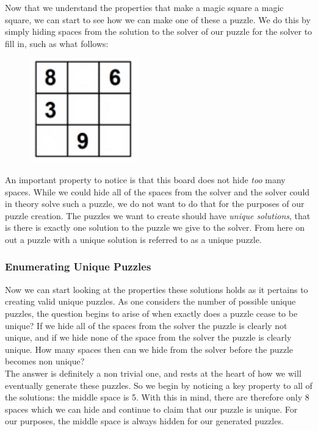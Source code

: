 \documentclass[a4paper]{article}
\begin{document}
Now that we understand the properties that make a magic square a magic square, we can start to see how we can make one of these a puzzle. We do this by simply hiding spaces from the solution to the solver of our puzzle for the solver to fill in, such as what follows:

\begin{figure} [h]
\includegraphics{puzzle_1}
\centering
\end{figure}

An important property to notice is that this board does not hide {\it too} many spaces. While we could hide all of the spaces from the solver and the solver could in theory solve such a puzzle, we do not want to do that for the purposes of our puzzle creation. The puzzles we want to create should have {\it unique solutions}, that is there is exactly one solution to the puzzle we give to the solver. From here on out a puzzle with a unique solution is referred to as a unique puzzle.

\subsubsection{Enumerating Unique Puzzles}

Now we can start looking at the properties these solutions holds as it pertains to creating valid unique puzzles. As one considers the number of possible unique puzzles, the question begins to arise of when exactly does a puzzle cease to be unique? If we hide all of the spaces from the solver the puzzle is clearly not unique, and if we hide none of the space from the solver the puzzle is clearly unique. How many spaces then can we hide from the solver before the puzzle becomes non unique? \\

The answer is definitely a non trivial one, and rests at the heart of how we will eventually generate these puzzles. So we begin by noticing a key property to all of the solutions: the middle space is 5. With this in mind, there are therefore only 8 spaces which we can hide and continue to claim that our puzzle is unique. For our purposes, the middle space is always hidden for our generated puzzles. \\
\end{document}

